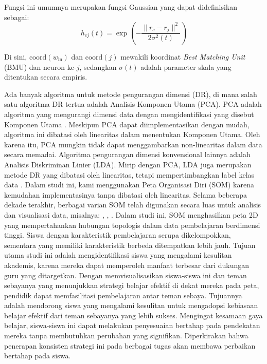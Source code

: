     Fungsi ini umumnya merupakan fungsi Gaussian yang dapat didefinisikan sebagai:
    \[
        h_{cj}(t) = \exp\!\left(-\frac{\|r_c - r_j\|^2}{2\sigma^2(t)}\right)
    \]

    Di sini, $\text{coord}(w_{\text{in}})$ dan $\text{coord}(j)$ mewakili koordinat \textit{Best Matching Unit} (BMU) dan neuron ke-$j$, sedangkan $\sigma(t)$ adalah parameter skala yang ditentukan secara empiris.

    Ada banyak algoritma untuk metode pengurangan dimensi (DR), di mana salah satu algoritma DR tertua adalah Analisis Komponen Utama (PCA). PCA adalah algoritma yang mengurangi dimensi data dengan mengidentifikasi yang disebut Komponen Utama \citep{Steffens1983}. Meskipun PCA dapat diimplementasikan dengan mudah, algoritma ini dibatasi oleh linearitas dalam menentukan Komponen Utama. Oleh karena itu, PCA mungkin tidak dapat menggambarkan non-linearitas dalam data secara memadai. Algoritma pengurangan dimensi konvensional lainnya adalah Analisis Diskriminan Linier (LDA). Mirip dengan PCA, LDA juga merupakan metode DR yang dibatasi oleh linearitas, tetapi mempertimbangkan label kelas data \citep{Hartono2017}. Dalam studi ini, kami menggunakan Peta Organisasi Diri (SOM) karena kemudahan implementasinya tanpa dibatasi oleh linearitas. Selama beberapa dekade terakhir, berbagai varian SOM telah digunakan secara luas untuk analisis dan visualisasi data, misalnya: \citep{Ahmad2018}, \citep{Bara2018}, \citep{Ahmad2018}. Dalam studi ini, SOM menghasilkan peta 2D yang mempertahankan hubungan topologis dalam data pembelajaran berdimensi tinggi. Siswa dengan karakteristik pembelajaran serupa dikelompokkan, sementara yang memiliki karakteristik berbeda ditempatkan lebih jauh. Tujuan utama studi ini adalah mengidentifikasi siswa yang mengalami kesulitan akademis, karena mereka dapat memperoleh manfaat terbesar dari dukungan guru yang ditargetkan. Dengan memvisualisasikan siswa-siswa ini dan teman sebayanya yang menunjukkan strategi belajar efektif di dekat mereka pada peta, pendidik dapat memfasilitasi pembelajaran antar teman sebaya. Tujuannya adalah mendorong siswa yang mengalami kesulitan untuk mengadopsi kebiasaan belajar efektif dari teman sebayanya yang lebih sukses. Mengingat kesamaan gaya belajar, siswa-siswa ini dapat melakukan penyesuaian bertahap pada pendekatan mereka tanpa membutuhkan perubahan yang signifikan. Diperkirakan bahwa penerapan konsisten strategi ini pada berbagai tugas akan membawa perbaikan bertahap pada siswa.

